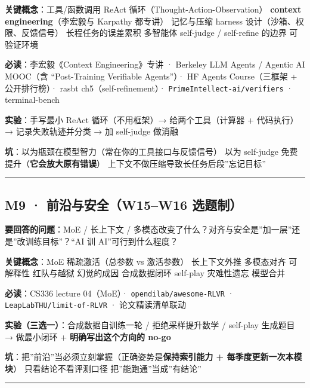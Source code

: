 \documentclass[
  chinese,
  11pt,
]{ctexart}
\begin{document}
\textbf{关键概念}：工具/函数调用 \textbar{} ReAct 循环（Thought-Action-Observation）\textbar{} \textbf{context engineering}（李宏毅与 Karpathy 都专讲）\textbar{} 记忆与压缩 \textbar{} harness 设计（沙箱、权限、反馈信号）\textbar{} 长程任务的误差累积 \textbar{} 多智能体 \textbar{} self-judge / self-refine 的边界 \textbar{} 可验证环境

\textbf{必读}：李宏毅《Context Engineering》专讲 · Berkeley LLM Agents / Agentic AI MOOC（含 ``Post-Training Verifiable Agents''）· HF Agents Course（三框架 + 公开排行榜）· rasbt ch5（self-refinement）· \texttt{PrimeIntellect-ai/verifiers} · terminal-bench

\textbf{实验}：手写最小 ReAct 循环（不用框架）→ 给两个工具（计算器 + 代码执行）→ 记录失败轨迹并分类 → 加 self-judge 做消融

\textbf{坑}：以为瓶颈在模型智力（常在你的工具接口与反馈信号）\textbar{} 以为 self-judge 免费提升（\textbf{它会放大原有错误}）\textbar{} 上下文不做压缩导致长任务后段''忘记目标''

\begin{center}\rule{0.5\linewidth}{0.5pt}\end{center}

\subsection{M9 · 前沿与安全（W15--W16 选题制）}\label{m9-ux524dux6cbfux4e0eux5b89ux5168w15w16-ux9009ux9898ux5236}

\textbf{要回答的问题}：MoE / 长上下文 / 多模态改变了什么？对齐与安全是''加一层''还是''改训练目标''？``AI 训 AI''可行到什么程度？

\textbf{关键概念}：MoE 稀疏激活（总参数 vs 激活参数）\textbar{} 长上下文外推 \textbar{} 多模态对齐 \textbar{} 可解释性 \textbar{} 红队与越狱 \textbar{} 幻觉的成因 \textbar{} 合成数据闭环 \textbar{} self-play \textbar{} 灾难性遗忘 \textbar{} 模型合并

\textbf{必读}：CS336 lecture 04（MoE）· \texttt{opendilab/awesome-RLVR} · \texttt{LeapLabTHU/limit-of-RLVR} · 论文精读清单联动

\textbf{实验（三选一）}：合成数据自训练一轮 / 拒绝采样提升数学 / self-play 生成题目 → 做最小闭环 + \textbf{明确写出这个方向的 no-go}

\textbf{坑}：把''前沿''当必须立刻掌握（正确姿势是\textbf{保持索引能力 + 每季度更新一次本模块}）\textbar{} 只看结论不看评测口径 \textbar{} 把''能跑通''当成''有结论''

\begin{center}\rule{0.5\linewidth}{0.5pt}\end{center}
\end{document}
